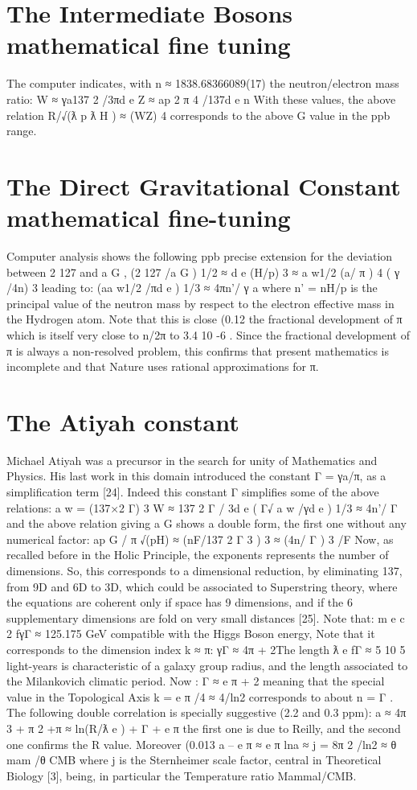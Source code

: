 \section {The Intermediate Bosons mathematical fine tuning}

The computer indicates, with n ≈ 1838.68366089(17) the neutron/electron mass ratio:
W ≈ γa137 2 /3πd e
Z ≈ ap 2 π 4 /137d e n
With these values, the above relation R/√(ƛ p ƛ H ) ≈ (WZ) 4 corresponds to the above G value in the
ppb range.

\section {The Direct Gravitational Constant mathematical fine-tuning}

Computer analysis shows the following ppb precise extension for the deviation between 2 127 and
a G ,
(2 127 /a G ) 1/2 ≈ d e (H/p) 3 ≈ a w1/2 (a/ π ) 4 ( γ /4n) 3
leading to:
(aa w1/2 /πd e ) 1/3 ≈ 4πn'/ γ a
where n' = nH/p is the principal value of the neutron mass by respect to the electron effective mass
in the Hydrogen atom. Note that this is close (0.12 %
the fractional development of π which is itself very close to n/2π to 3.4 10 -6 . Since the fractional
development of π is always a non-resolved problem, this confirms that present mathematics is
incomplete and that Nature uses rational approximations for π.

\section {The Atiyah constant}

Michael Atiyah was a precursor in the search for unity of Mathematics and Physics. His last
work in this domain introduced the constant Γ = γa/π, as a simplification term [24]. Indeed this
constant Γ simplifies some of the above relations:
a w = (137×2 Γ) 3
W ≈ 137 2 Γ / 3d e
( Γ√ a w /γd e ) 1/3 ≈ 4n'/ Γ
and the above relation giving a G shows a double form, the first one without any numerical factor:
ap G / π √(pH) ≈ (nF/137 2 Γ 3 ) 3 ≈ (4n/ Γ ) 3 /F
Now, as recalled before in the Holic Principle, the exponents represents the number of
dimensions. So, this corresponds to a dimensional reduction, by eliminating 137, from 9D and 6D to
3D, which could be associated to Superstring theory, where the equations are coherent only if space
has 9 dimensions, and if the 6 supplementary dimensions are fold on very small distances [25].
Note that:
m e c 2 f{γΓ} ≈ 125.175 GeV
compatible with the Higgs Boson energy, Note that it corresponds to the dimension index k ≈ π: γΓ
≈ 4π + 2The length ƛ e f{Γ} ≈ 5 10 5 light-years is characteristic of a galaxy group radius, and the length
associated to the Milankovich climatic period. Now :
Γ ≈ e π + 2
meaning that the special value in the Topological Axis k = e π /4 ≈ 4/ln2 corresponds to about n = Γ .
The following double correlation is specially suggestive (2.2 and 0.3 ppm):
a ≈ 4π 3 + π 2 +π ≈ ln(R/ƛ e ) + Γ + e π
the first one is due to Reilly, and the second one confirms the R value. Moreover (0.013%
a – e π ≈ e π lna ≈ j = 8π 2 /ln2 ≈ θ mam /θ CMB
where j is the Sternheimer scale factor, central in Theoretical Biology [3], being, in particular the
Temperature ratio Mammal/CMB.
